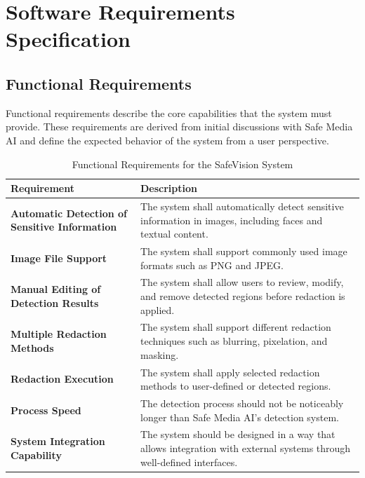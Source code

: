 \chapter{Software Requirements Specification}


\section{Functional Requirements}

Functional requirements describe the core capabilities that the system must provide. These requirements are derived from initial discussions with Safe Media AI and define the expected behavior of the system from a user perspective.

\begin{table}[htbp]
\centering
\begin{tabular}{|p{5cm}|p{9cm}|}
\hline
\textbf{Requirement} & \textbf{Description} \\ \hline

\textbf{Automatic Detection of Sensitive Information} & 
The system shall automatically detect sensitive information in images, including faces and textual content. \\ \hline

\textbf{Image File Support} & 
The system shall support commonly used image formats such as PNG and JPEG. \\ \hline

\textbf{Manual Editing of Detection Results} & 
The system shall allow users to review, modify, and remove detected regions before redaction is applied. \\ \hline

\textbf{Multiple Redaction Methods} & 
The system shall support different redaction techniques such as blurring, pixelation, and masking. \\ \hline

\textbf{Redaction Execution} & 
The system shall apply selected redaction methods to user-defined or detected regions. \\ \hline

\textbf{Process Speed} &
The detection process should not be noticeably longer than Safe Media AI's detection system. \\ \hline

\textbf{System Integration Capability} & 
The system should be designed in a way that allows integration with external systems through well-defined interfaces. \\ \hline

\end{tabular}
\caption{Functional Requirements for the SafeVision System}
\label{tab:functional_requirements}
\end{table}

